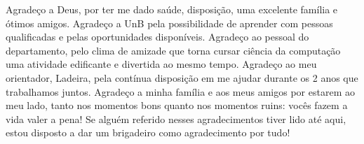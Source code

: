 Agradeço a Deus, por ter me dado saúde, disposição, uma excelente família e ótimos
amigos. 
Agradeço a UnB pela possibilidade de aprender com pessoas qualificadas e pelas 
oportunidades disponíveis.
Agradeço ao pessoal do departamento, pelo clima de
amizade que torna cursar ciência da computação uma atividade edificante e divertida
ao mesmo tempo. 
Agradeço ao meu orientador, Ladeira, pela contínua disposição em me ajudar durante
os 2 anos que trabalhamos juntos.  
Agradeço a minha família e aos meus amigos por estarem ao meu lado, tanto nos
momentos bons quanto nos momentos ruins: vocês fazem a vida valer a pena! 
Se alguém referido nesses agradecimentos tiver lido até aqui, estou disposto a dar
um brigadeiro como agradecimento por tudo!
